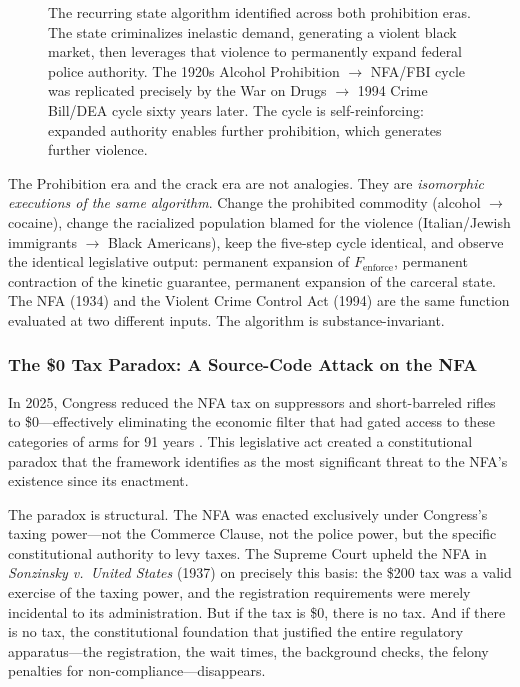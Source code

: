 \documentclass[12pt,openany]{book}
\begin{document}
\begin{figure}[htbp]
\caption{The recurring state algorithm identified across both prohibition eras. The state criminalizes inelastic demand, generating a violent black market, then leverages that violence to permanently expand federal police authority. The 1920s Alcohol Prohibition $\rightarrow$ NFA/FBI cycle was replicated precisely by the War on Drugs $\rightarrow$ 1994 Crime Bill/DEA cycle sixty years later. The cycle is self-reinforcing: expanded authority enables further prohibition, which generates further violence.}
\label{fig:prohibition-algorithm}
\end{figure}

\begin{keyinsight}
The Prohibition era and the crack era are not analogies. They are \textit{isomorphic executions of the same algorithm}. Change the prohibited commodity (alcohol $\rightarrow$ cocaine), change the racialized population blamed for the violence (Italian/Jewish immigrants $\rightarrow$ Black Americans), keep the five-step cycle identical, and observe the identical legislative output: permanent expansion of $F_{\text{enforce}}$, permanent contraction of the kinetic guarantee, permanent expansion of the carceral state. The NFA (1934) and the Violent Crime Control Act (1994) are the same function evaluated at two different inputs. The algorithm is substance-invariant.
\end{keyinsight}

\subsubsection{The \$0 Tax Paradox: A Source-Code Attack on the NFA}

In 2025, Congress reduced the NFA tax on suppressors and short-barreled rifles to \$0---effectively eliminating the economic filter that had gated access to these categories of arms for 91 years \cite{nfataxzero}. This legislative act created a constitutional paradox that the framework identifies as the most significant threat to the NFA's existence since its enactment.

The paradox is structural. The NFA was enacted exclusively under Congress's taxing power---not the Commerce Clause, not the police power, but the specific constitutional authority to levy taxes. The Supreme Court upheld the NFA in \textit{Sonzinsky v.\ United States} (1937) on precisely this basis: the \$200 tax was a valid exercise of the taxing power, and the registration requirements were merely incidental to its administration. But if the tax is \$0, there is no tax. And if there is no tax, the constitutional foundation that justified the entire regulatory apparatus---the registration, the wait times, the background checks, the felony penalties for non-compliance---disappears.
\end{document}
